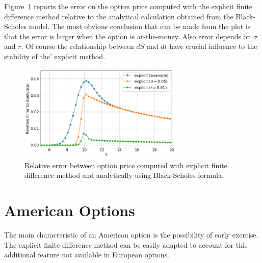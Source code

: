 Figure~\ref{fig:explicit_relative_error} reports the error on the option price computed with the explicit finite difference method relative to the analytical calculation obtained from the Black-Scholes model. The most obvious conclusion that can be made from the plot is that the error is larger when the option is at-the-money. Also error depends on $\sigma$ and $r$. Of course the relationship between $dS$ and $dt$ have crucial influence to the stability of the' explicit method. 
 
\begin{figure}[htb]
	\centering
	\includegraphics[width=0.7\textwidth]{figures/explicit_relative_error}
	\caption{Relative error between option price computed with explicit finite difference method and analytically using Black-Scholes formula.}
	\label{fig:explicit_relative_error}
\end{figure} 

\section{American Options}
The main characteristic of an American option is the possibility of early exercise. 
The explicit finite difference method can be easily adapted to account for this additional feature not available in European options.

